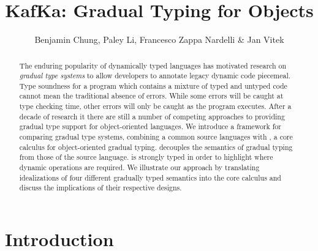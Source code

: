 \documentclass[USenglish]{tex/lipics-v2016}
\begin{document}
\title{KafKa: Gradual Typing for Objects}
\author{Benjamin Chung, Paley Li, Francesco Zappa Nardelli \& Jan Vitek}


\EventLogo{}


\maketitle

\begin{abstract} 
The enduring popularity of dynamically typed languages has motivated
research on \emph{gradual type systems} to allow developers to annotate
legacy dynamic code piecemeal. Type soundness for a program which contains a
mixture of typed and untyped code cannot mean the traditional absence of
errors. While some errors will be caught at type checking time, other errors
will only be caught as the program executes. After a decade of research it
there are still a number of competing approaches to providing gradual type
support for object-oriented languages. We introduce a framework for
comparing gradual type systems, combining a common source languages with
\kafka, a core calculus for object-oriented gradual typing.  \kafka
decouples the semantics of gradual typing from those of the source
language. \kafka is strongly typed in order to highlight where dynamic
operations are required.  We illustrate our approach by translating
idealizations of four different gradually typed semantics into the core
calculus and discuss the implications of their respective designs.
\end{abstract}

\section{Introduction}
\end{document}

